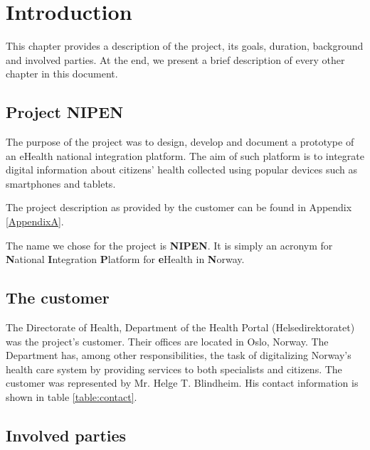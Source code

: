 
\chapter{Introduction} 
\label{Introduction} 


This chapter provides a description of the project, its goals, duration, background and involved parties.
At the end, we present a brief description of every other chapter in this document.

\section{Project NIPEN}
\label{section:description}

The purpose of the project was to design, develop and document a prototype of an eHealth national integration platform.
The aim of such platform is to integrate digital information about citizens' health \iffalse which is\fi
collected using popular devices such as smartphones and tablets.
\iffalse
The intention of such a platform is to enable citizens’ the ability to publish and fetch health information they produce
into the government run citizen centric health portal helsenorge.no.
\fi
The project description as provided by the customer can be found in Appendix \ref{AppendixA}.

The name we chose for the project is \textbf{NIPEN}.\newline
It is simply an acronym for \textbf{N}ational \textbf{I}ntegration \textbf{P}latform for \textbf{e}Health
in \textbf{N}orway.

\section{The customer}
\label{section:customer}

The Directorate of Health, Department of the Health Portal (Helsedirektoratet) was the project's customer.
Their offices are located in Oslo, Norway. 
The Department has, among other responsibilities, the task of digitalizing Norway's health care system by providing
services to both specialists and citizens. The customer was represented by Mr. Helge T. Blindheim.
His contact information is shown in table \ref{table:contact}.

\section{Involved parties}
\label{section:parties}

